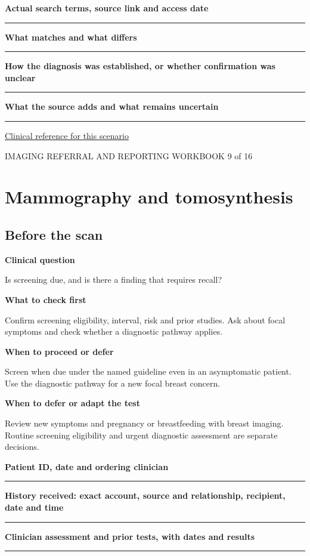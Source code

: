\documentclass[11pt,a4paper]{article}
\newcommand{\record}[1]{\textbf{#1}\par\vspace{0.55\baselineskip}\hrule\vspace{0.35\baselineskip}}
\begin{document}
\record{Actual search terms, source link and access date}

\record{What matches and what differs}

\record{How the diagnosis was established, or whether confirmation was unclear}

\record{What the source adds and what remains uncertain}

\small\href{https://www.jacc.org/doi/10.1016/j.jacc.2021.07.053}{Clinical reference for this scenario}

\normalsize

\newpage

{\small IMAGING REFERRAL AND REPORTING WORKBOOK \hfill 9 of 16}

\section*{Mammography and tomosynthesis}

\subsection*{Before the scan}

\textbf{Clinical question}\par Is screening due, and is there a finding that requires recall?\par

\textbf{What to check first}\par Confirm screening eligibility, interval, risk and prior studies. Ask about focal symptoms and check whether a diagnostic pathway applies.\par

\textbf{When to proceed or defer}\par Screen when due under the named guideline even in an asymptomatic patient. Use the diagnostic pathway for a new focal breast concern.\par

\textbf{When to defer or adapt the test}\par Review new symptoms and pregnancy or breastfeeding with breast imaging. Routine screening eligibility and urgent diagnostic assessment are separate decisions.\par

\record{Patient ID, date and ordering clinician}

\record{History received: exact account, source and relationship, recipient, date and time}

\record{Clinician assessment and prior tests, with dates and results}
\end{document}
